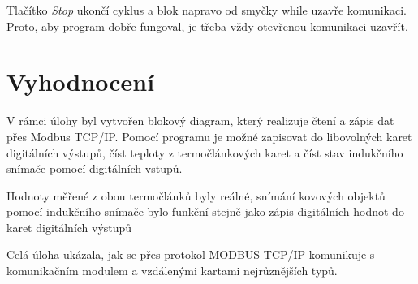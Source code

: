 Tlačítko \textit{Stop} ukončí cyklus a blok napravo od smyčky while uzavře komunikaci. Proto, aby program dobře fungoval, je třeba vždy otevřenou komunikaci uzavřít.

\section{Vyhodnocení}
V rámci úlohy byl vytvořen blokový diagram, který realizuje čtení a zápis dat přes Modbus TCP/IP. Pomocí programu je možné zapisovat do libovolných karet digitálních výstupů, číst teploty z termočlánkových karet a číst stav indukčního snímače pomocí digitálních vstupů.

Hodnoty měřené z obou termočlánků byly reálné, snímání kovových objektů pomocí indukčního snímače bylo funkční stejně jako zápis digitálních hodnot do karet digitálních výstupů

Celá úloha ukázala, jak se přes protokol MODBUS TCP/IP komunikuje s komunikačním modulem a vzdálenými kartami nejrůznějších typů.


